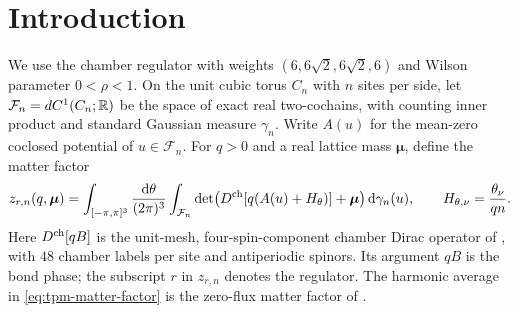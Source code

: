 \section{Introduction}

We use the chamber regulator with weights $(6,6\sqrt2,6\sqrt2,6)$
and Wilson parameter $0<\rho<1$. On the unit cubic torus $C_n$
with $n$ sites per side, let
$\mathcal F_n=dC^1(C_n;\mathbb R)$ be the space of exact real two-cochains,
with counting inner product and standard Gaussian measure $\gamma_n$.
Write $A(u)$ for the mean-zero coclosed potential of $u\in\mathcal F_n$.
For $q>0$ and a real lattice mass $\boldsymbol\mu$, define the matter factor
\begin{equation}\label{eq:tpm-matter-factor}
 z_{r,n}(q,\boldsymbol\mu)=
 \int_{[-\pi,\pi]^3}\frac{\mathrm d\theta}{(2\pi)^3}
 \int_{\mathcal F_n}
 \det\bigl(D^{\rm ch}[q(A(u)+H_\theta)]+\boldsymbol\mu\bigr)
 \,\mathrm d\gamma_n(u),\qquad
 H_{\theta,\nu}=\frac{\theta_\nu}{qn}.
\end{equation}
Here $D^{\rm ch}[qB]$ is the unit-mesh, four-spin-component
chamber Dirac operator of \cite[\S2]{ChamberLattice}, with $48$
chamber labels per site and antiperiodic spinors. Its argument $qB$
is the bond phase; the subscript $r$ in $z_{r,n}$ denotes the regulator.
The harmonic average in \eqref{eq:tpm-matter-factor} is the
zero-flux matter factor of \cite[(37)--(40)]{ReferenceResponse}.


